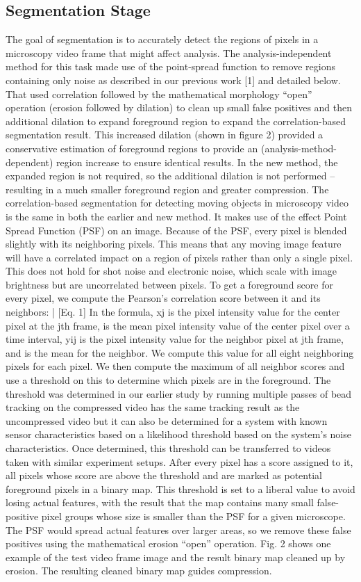 \subsection{Segmentation Stage}
The goal of segmentation is to accurately detect the regions of pixels in a microscopy video frame that might affect analysis.  The analysis-independent method for this task made use of the point-spread function to remove regions containing only noise as described in our previous work [1] and detailed below. That used correlation followed by the mathematical morphology “open” operation (erosion followed by dilation) to clean up small false positives and then additional dilation to expand foreground region to expand the correlation-based segmentation result. This increased dilation (shown in figure 2) provided a conservative estimation of foreground regions to provide an (analysis-method-dependent) region increase to ensure identical results.  In the new method, the expanded region is not required, so the additional dilation is not performed – resulting in a much smaller foreground region and greater compression.
The correlation-based segmentation for detecting moving objects in microscopy video is the same in both the earlier and new method. It makes use of the effect Point Spread Function (PSF) on an image. Because of the PSF, every pixel is blended slightly with its neighboring pixels.  This means that any moving image feature will have a correlated impact on a region of pixels rather than only a single pixel. This does not hold for shot noise and electronic noise, which scale with image brightness but are uncorrelated between pixels. To get a foreground score for every pixel, we compute the Pearson’s correlation score between it and its neighbors:
 |    [Eq. 1]
In the formula, xj is the pixel intensity value for the center pixel at the jth frame,  is the mean pixel intensity value of the center pixel over a time interval, yij is the pixel intensity value for the neighbor pixel at jth frame, and  is the mean for the neighbor.
We compute this value for all eight neighboring pixels for each pixel. We then compute the maximum of all neighbor scores and use a threshold on this to determine which pixels are in the foreground. The threshold was determined in our earlier study by running multiple passes of bead tracking on the compressed video has the same tracking result as the uncompressed video but it can also be determined for a system with known sensor characteristics based on a likelihood threshold based on the system’s noise characteristics. Once determined, this threshold can be transferred to videos taken with similar experiment setups. After every pixel has a score assigned to it, all pixels whose score are above the threshold and are marked as potential foreground pixels in a binary map. This threshold is set to a liberal value to avoid losing actual features, with the result that the map contains many small false-positive pixel groups whose size is smaller than the PSF for a given microscope. The PSF would spread actual features over larger areas, so we remove these false positives using the mathematical erosion “open” operation. Fig. 2 shows one example of the test video frame image and the result binary map cleaned up by erosion. The resulting cleaned binary map guides compression.

